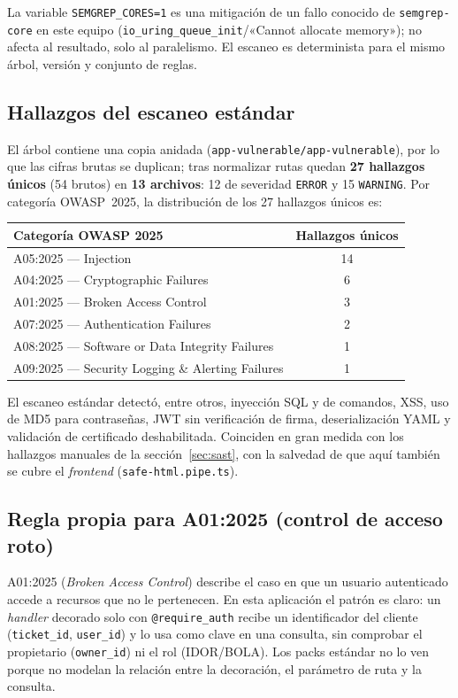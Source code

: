 \documentclass[11pt,letterpaper]{article}
\newcommand{\f}[1]{\texttt{#1}}
\newcommand{\enc}[1]{\textbf{#1}}
\begin{document}
La variable \f{SEMGREP\_CORES=1} es una mitigación de un fallo conocido de \f{semgrep-core} en este equipo (\f{io\_uring\_queue\_init}/«Cannot allocate memory»); no afecta al resultado, solo al paralelismo. El escaneo es determinista para el mismo árbol, versión y conjunto de reglas.

\subsection{Hallazgos del escaneo estándar}

El árbol contiene una copia anidada (\f{app-vulnerable/app-vulnerable}), por lo que las cifras brutas se duplican; tras normalizar rutas quedan \textbf{27 hallazgos únicos} (54 brutos) en \textbf{13 archivos}: 12 de severidad \f{ERROR} y 15 \f{WARNING}. Por categoría OWASP~2025, la distribución de los 27 hallazgos únicos es:

\begin{center}
\begin{tabular}{lc}
\toprule
\enc{Categoría OWASP 2025} & \enc{Hallazgos únicos} \\
\midrule
A05:2025 --- Injection & 14 \\
A04:2025 --- Cryptographic Failures & 6 \\
A01:2025 --- Broken Access Control & 3 \\
A07:2025 --- Authentication Failures & 2 \\
A08:2025 --- Software or Data Integrity Failures & 1 \\
A09:2025 --- Security Logging \& Alerting Failures & 1 \\
\bottomrule
\end{tabular}
\end{center}

El escaneo estándar detectó, entre otros, inyección SQL y de comandos, XSS, uso de MD5 para contraseñas, JWT sin verificación de firma, deserialización YAML y validación de certificado deshabilitada. Coinciden en gran medida con los hallazgos manuales de la sección~\ref{sec:sast}, con la salvedad de que aquí también se cubre el \textit{frontend} (\f{safe-html.pipe.ts}).

\subsection{Regla propia para A01:2025 (control de acceso roto)}

A01:2025 (\textit{Broken Access Control}) describe el caso en que un usuario autenticado accede a recursos que no le pertenecen. En esta aplicación el patrón es claro: un \textit{handler} decorado solo con \f{@require\_auth} recibe un identificador del cliente (\f{ticket\_id}, \f{user\_id}) y lo usa como clave en una consulta, sin comprobar el propietario (\f{owner\_id}) ni el rol (IDOR/BOLA). Los packs estándar no lo ven porque no modelan la relación entre la decoración, el parámetro de ruta y la consulta.
\end{document}
